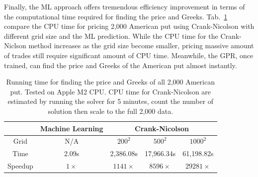 \documentclass[%
 reprint,
 superscriptaddress,
nobibnotes,
 amsmath,amssymb,
 aps,
]{revtex4-2}
\begin{document}
Finally, the ML approach offers tremendous efficiency improvement in terms of the computational time required for finding the price and Greeks. Tab.~\ref{tab:run_time} compare the CPU time for pricing 2,000 American put using Crank-Nicolson with different grid size and the ML prediction. While the CPU time for the Crank-Niclson method increases as the grid size become smaller, pricing massive amount of trades still require significant amount of CPU time. Meanwhile, the GPR, once trained, can find the price and Greeks of the American put almost instantly.

\begin{table}[!h]
    \centering
    \begin{tabular}{|c |c |c |c |c|}
    \hline
    & Machine Learning & \multicolumn{3}{c|}{Crank-Nicolson}  \\
    \hline
     Grid & N/A  &  $200^2$ & $500^2$ &$1000^2$  \\ \hline
      Time & 2.09s &  2,386.08s & 17,966.34s & 61,198.82s    \\ \hline 
      Speedup & $1\times$  & $1141\times$ & $8596\times$ & $29281\times$ \\ \hline
    \end{tabular}
    \caption{Running time for finding the price and Greeks of all 2,000 American put. Tested on Apple M2 CPU. CPU time for Crank-Nicolson are estimated by running the solver for 5 minutes, count the number of solution then scale to the full 2,000 data.}
    \label{tab:run_time}
\end{table}
\end{document}
